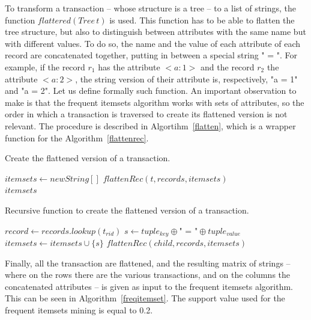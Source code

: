 \documentclass{acm_proc_article-sp-sigmod09}
\begin{document}
To transform a transaction -- whose structure is a tree -- to a list of strings, the function $flattered(Tree \, t)$ is used. This function has to be able to flatten the tree structure, but also to distinguish between attributes with the same name but with different values. To do so, the name and the value of each attribute of each record are concatenated together, putting in between a special string " = ". For example, if the record $r_1$ has the attribute $<a \colon 1>$ and the record $r_2$ the attribute $<a \colon 2>$, the string version of their attribute is, respectively, "a = 1" and "a = 2". Let us define formally such function. An important observation to make is that the frequent itemsets algorithm works with sets of attributes, so the order in which a transaction is traversed to create its flattened version is not relevant. The procedure is described in Algortihm~\ref{flatten}, which is a wrapper function for the Algorithm~\ref{flattenrec}.

\begin{algorithm}
\caption{Create the flattened version of a transaction.}
\label{flatten}
\begin{algorithmic}[1]
\State $itemsets \gets new String[]$
\State $flattenRec(t, records, itemsets)$ \\
\Return $itemsets$
\EndFunction
\end{algorithmic}
\end{algorithm}

\begin{algorithm}
\caption{Recursive function to create the flattened version of a transaction.}
\label{flattenrec}
\begin{algorithmic}[1]
\State $record \gets records.lookup(t_{rid})$
	\State $s \gets tuple_{key} \oplus \text{" = "} \oplus tuple_{value}$
	\State $itemsets \gets itemsets \cup \{s\}$
\EndFor
{}
	\State $flattenRec(child, records, itemsets)$
\EndFor
\EndFunction
\end{algorithmic}
\end{algorithm}

Finally, all the transaction are flattened, and the resulting matrix of strings -- where on the rows there are the various transactions, and on the columns the concatenated attributes -- is given as input to the frequent itemsets algorithm. This can be seen in Algorithm~\ref{freqitemset}. The support value used for the frequent itemsets mining is equal to 0.2.
\end{document}
